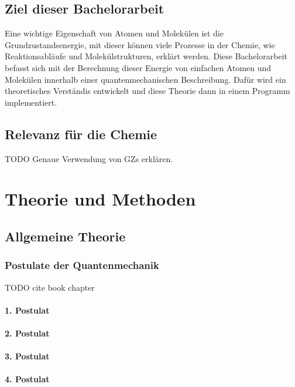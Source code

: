 \documentclass[a4paper, 12pt]{report}
\begin{document}
\section{Ziel dieser Bachelorarbeit}
Eine wichtige Eigenschaft von Atomen und Molekülen ist die Grundzustandsenergie, 
mit dieser können viele Prozesse in der Chemie,
wie Reaktionsabläufe und Molekülstrukturen, erklärt werden.
Diese Bachelorarbeit befasst sich mit der Berechnung 
dieser Energie von einfachen Atomen und Molekülen innerhalb einer quantenmechanischen Beschreibung.
Dafür wird ein theoretisches Verständis entwickelt 
und diese Theorie dann in einem Programm implementiert.

\section{Relevanz für die Chemie}
TODO Genaue Verwendung von GZs erklären. 

\chapter{Theorie und Methoden}
\section{Allgemeine Theorie}

\subsection{Postulate der Quantenmechanik}

TODO cite book chapter

\subsubsection{1. Postulat}
\subsubsection{2. Postulat}
\subsubsection{3. Postulat}
\subsubsection{4. Postulat}
\end{document}
